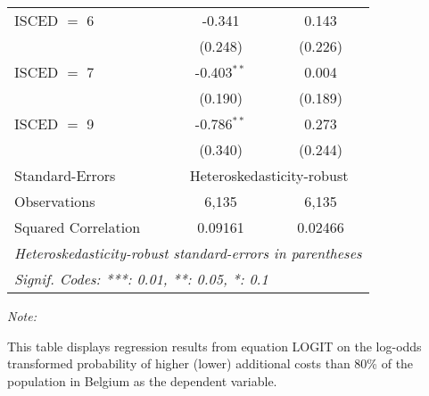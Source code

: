 \begin{table}[htbp!]
\begin{adjustbox}{width = 1\textwidth, max height = 0.95\textheight, center}
\begin{threeparttable}[b]
\begin{tabular}{lcc}
            ISCED $=$ 6          & -0.341        & 0.143\\   
                                 & (0.248)       & (0.226)\\   
            ISCED $=$ 7          & -0.403$^{**}$ & 0.004\\   
                                 & (0.190)       & (0.189)\\   
            ISCED $=$ 9          & -0.786$^{**}$ & 0.273\\   
                                 & (0.340)       & (0.244)\\   
            \midrule 
            Standard-Errors & \multicolumn{2}{c}{Heteroskedasticity-robust} \\ 
            Observations         & 6,135         & 6,135\\  
            Squared Correlation  & 0.09161       & 0.02466\\  
            \midrule \midrule
            \multicolumn{3}{l}{\emph{Heteroskedasticity-robust standard-errors in parentheses}}\\
            \multicolumn{3}{l}{\emph{Signif. Codes: ***: 0.01, **: 0.05, *: 0.1}}\\
         \end{tabular}
         
         \begin{tablenotes}\item \medskip \textit{Note:}
            \item This table displays regression results from equation LOGIT on the log-odds transformed probability of higher (lower) additional costs than 80\% of the population in Belgium as the dependent variable. 
         \end{tablenotes}
      \end{threeparttable}
   \end{adjustbox}
\end{table}


